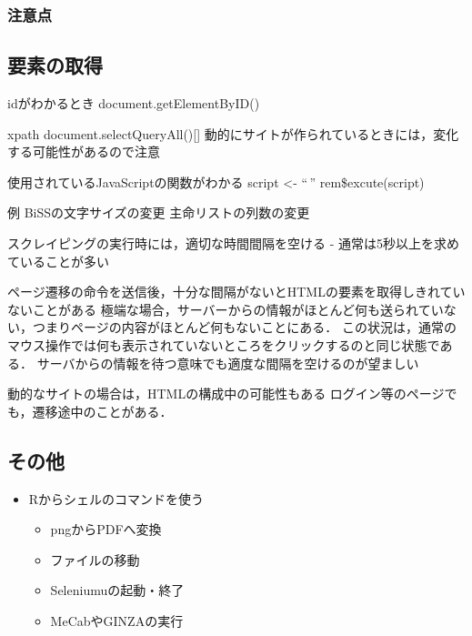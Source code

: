 \documentclass[
]{article}
\providecommand{\tightlist}{%
  \setlength{\itemsep}{0pt}\setlength{\parskip}{0pt}}
\begin{document}
\hypertarget{ux6ce8ux610fux70b9-2}{%
\subsubsection{注意点}\label{ux6ce8ux610fux70b9-2}}

\hypertarget{ux8981ux7d20ux306eux53d6ux5f97}{%
\subsection{要素の取得}\label{ux8981ux7d20ux306eux53d6ux5f97}}

idがわかるとき
document.getElementByID()

xpath
document.selectQueryAll(){[}{]}
動的にサイトが作られているときには，変化する可能性があるので注意

使用されているJavaScriptの関数がわかる
script \textless- ``\,''
rem\$excute(script)

例
BiSSの文字サイズの変更
主命リストの列数の変更

スクレイピングの実行時には，適切な時間間隔を空ける
- 通常は5秒以上を求めていることが多い

ページ遷移の命令を送信後，十分な間隔がないとHTMLの要素を取得しきれていないことがある
極端な場合，サーバーからの情報がほとんど何も送られていない，つまりページの内容がほとんど何もないことにある．
この状況は，通常のマウス操作では何も表示されていないところをクリックするのと同じ状態である．
サーバからの情報を待つ意味でも適度な間隔を空けるのが望ましい

動的なサイトの場合は，HTMLの構成中の可能性もある
ログイン等のページでも，遷移途中のことがある．

\hypertarget{ux305dux306eux4ed6}{%
\subsection{その他}\label{ux305dux306eux4ed6}}

\begin{itemize}
\tightlist
\item
  Rからシェルのコマンドを使う

  \begin{itemize}
  \tightlist
  \item
    pngからPDFへ変換\\
  \item
    ファイルの移動\\
  \item
    Seleniumuの起動・終了\\
  \item
    MeCabやGINZAの実行
  \end{itemize}
\end{itemize}
\end{document}
